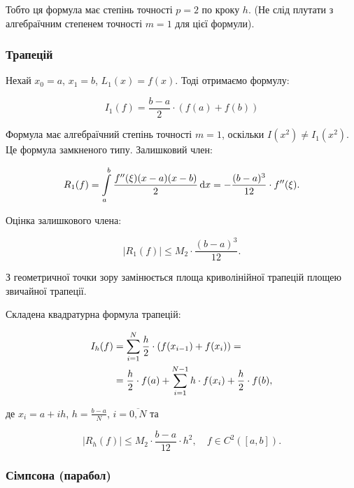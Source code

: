 Тобто ця формула має степінь точності $p = 2$ по кроку $h$. (Не слід плутати з алгебраїчним степенем точності $m = 1$ для цієї формули).

\subsubsection{Трапецій}

Нехай $x_0 = a$, $x_1 = b$, $L_1(x) = f(x)$. Тоді отримаємо формулу:

\begin{equation}
	I_1(f) = \frac{b - a}{2} \cdot (f(a) + f(b))
\end{equation}

Формула має алгебраїчний степінь точності $m = 1$, оскільки $I(x^2) \ne I_1(x^2)$. Це формула замкненого типу. Залишковий член:

\begin{equation}
	R_1(f) = \displaystyle\int\limits_a^b \frac{f''(\xi)(x - a)(x - b)}{2} \mathop{}\!\mathrm{d} x = - \frac{(b - a)^3}{12} \cdot f''(\xi).
\end{equation}

Оцінка залишкового члена:

\begin{equation}
	|R_1(f)| \le M_2 \cdot \frac{(b - a)^3}{12}.
\end{equation}

З геометричної точки зору замінюється площа криволінійної трапецій площею звичайної трапеції. \medskip

Складена квадратурна формула трапецій:

\begin{equation}
	\begin{aligned}
		I_h(f) &= \displaystyle\sum\limits_{i = 1}^N \frac{h}{2} \cdot (f(x_{i - 1}) + f(x_i)) = \\
		&= \frac{h}{2} \cdot f(a) + \displaystyle\sum\limits_{i = 1}^{N - 1} h \cdot f(x_i) + \frac{h}{2} \cdot f(b),
	\end{aligned}
\end{equation}

де $x_i = a + i h$, $h = \frac{b - a}{N}$, $i = \overline{0, N}$ та

\begin{equation}
	|R_h(f)| \le M_2 \cdot \frac{b - a}{12} \cdot h^2, \quad f \in C^2([a,b]).
\end{equation}

\subsubsection{Сімпсона (парабол)}

